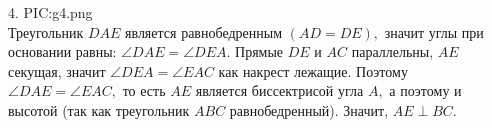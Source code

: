 4. {{PIC:g4.png}}\\
Треугольник $DAE$ является равнобедренным $(AD=DE),$ значит углы при основании равны: $\angle DAE=\angle DEA.$ Прямые $DE$ и $AC$ параллельны, $AE$ секущая, значит  $\angle DEA=\angle EAC$ как накрест лежащие. Поэтому $\angle DAE=\angle EAC,$ то есть $AE$ является биссектрисой угла $A,$ а поэтому и высотой (так как треугольник $ABC$ равнобедренный). Значит, $AE\perp BC.$\\
